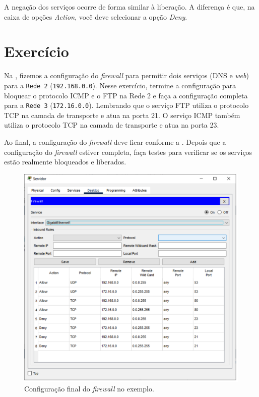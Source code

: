 A negação dos serviços ocorre de forma similar à liberação. A diferença é que, na caixa de opções \textit{Action}, você deve selecionar a opção \textit{Deny}. 

\section{Exercício}
Na , fizemos a configuração do \textit{firewall} para permitir dois serviços (DNS e \textit{web}) para a \texttt{Rede 2} (\texttt{192.168.0.0}). Nesse exercício, termine a configuração para bloquear o protocolo ICMP e o FTP na Rede 2 e faça a configuração completa para a \texttt{Rede 3} (\texttt{172.16.0.0}). Lembrando que o serviço FTP utiliza o protocolo TCP na camada de transporte e atua na porta 21. O serviço ICMP também utiliza o protocolo TCP na camada de transporte e atua na porta 23.

Ao final, a configuração do \textit{firewall} deve ficar conforme a . Depois que a configuração do \textit{firewall} estiver completa, faça testes para verificar se os serviços estão realmente bloqueados e liberados. 

\begin{figure}[!htb]
    \centering
    \includegraphics[width=.9\textwidth]{Figuras/configFirewall}
    \caption{Configuração final do \textit{firewall} no exemplo.}\label{fig:configFirewall}
\end{figure}